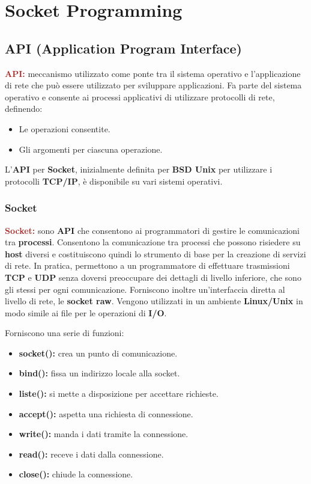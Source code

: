 \chapter{Socket Programming}
\section{API (Application Program Interface)}
\begin{boxDef}
\textbf{\textcolor{brown}{API:}} meccanismo utilizzato come ponte tra il sistema operativo e l'applicazione di rete che può essere utilizzato per sviluppare applicazioni. Fa parte del sistema operativo e consente ai processi applicativi di utilizzare protocolli di rete, definendo:
\begin{itemize}
    \item Le operazioni consentite.
    \item Gli argomenti per ciascuna operazione.
\end{itemize}
\end{boxDef}
L'\textbf{API} per \textbf{Socket}, inizialmente definita per \textbf{BSD Unix} per utilizzare i protocolli \textbf{ TCP/IP}, è disponibile su vari sistemi operativi.

\subsection{Socket}
\begin{boxDef}
\textbf{\textcolor{brown}{Socket:}} sono \textbf{API} che consentono ai programmatori di gestire le comunicazioni tra \textbf{processi}. Consentono la comunicazione tra processi che possono risiedere su \textbf{host} diversi e costituiscono quindi lo strumento di base per la creazione di servizi di rete.
In pratica, permettono a un programmatore di effettuare trasmissioni \textbf{TCP} e \textbf{UDP} senza doversi preoccupare dei dettagli di livello inferiore, che sono gli stessi per ogni comunicazione.
Forniscono inoltre un'interfaccia diretta al livello di rete, le \textbf{socket raw}. Vengono utilizzati in un ambiente \textbf{Linux/Unix} in modo simile ai file per le operazioni di \textbf{I/O}.
\end{boxDef}
Forniscono una serie di funzioni:
\begin{itemize}
    \item \textbf{socket():} crea un punto di comunicazione.
    \item \textbf{bind():} fissa un indirizzo locale alla socket.
    \item \textbf{liste():} si mette a disposizione per accettare richieste.
    \item \textbf{accept():} aspetta una richiesta di connessione.
    \item \textbf{write():} manda i dati tramite la connessione.
    \item \textbf{read():} receve i dati dalla connessione.
    \item \textbf{close():} chiude la connessione.
\end{itemize}

